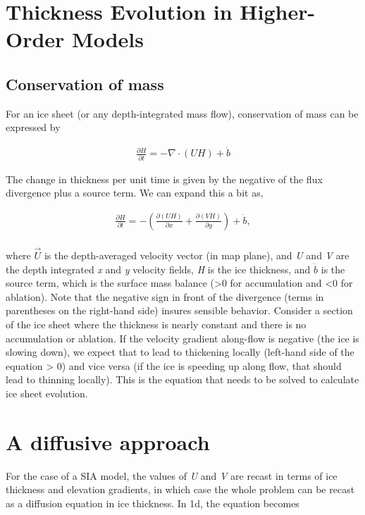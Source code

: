 
\section{Thickness Evolution in Higher-Order Models}

\subsection{Conservation of mass}
For an ice sheet (or any depth-integrated mass flow), conservation of mass can be expressed by

\begin{align*}
\frac{\partial H}{\partial t}=-\nabla \cdot \left( UH \right)+\dot{b}
\end{align*}

The change in thickness per unit time is given by the negative of the flux divergence plus a source term. We can expand this a bit as,


\begin{align*}\frac{\partial H}{\partial t}=-\left( \frac{\partial \left( UH \right)}{\partial x}+\frac{\partial \left( VH \right)}{\partial y} \right)+\dot{b}, \\ 
\end{align*}

where $\vec{U}$ is the depth-averaged velocity vector (in map plane), and \textit{U} and \textit{V} are the depth integrated \textit{x} and \textit{y} velocity fields, \textit{H} is the ice thickness, and $\dot{b}$ is the source term, which is the surface mass balance (>0 for accumulation and <0 for ablation). Note that the negative sign in front of the divergence (terms in parentheses on the right-hand side) insures sensible behavior. Consider a section of the ice sheet where the thickness is nearly constant and there is no accumulation or ablation. If the velocity gradient along-flow is negative (the ice is slowing down), we expect that to lead to thickening locally (left-hand side of the equation > 0) and vice versa (if the ice is speeding up along flow, that should lead to thinning locally). This is the equation that needs to be solved to calculate ice sheet evolution.

\section{A diffusive approach}
For the case of a SIA model, the values of \textit{U} and \textit{V} are recast in terms of ice thickness and elevation gradients, in which case the whole problem can be recast as a diffusion equation in ice thickness. In 1d, the equation becomes

